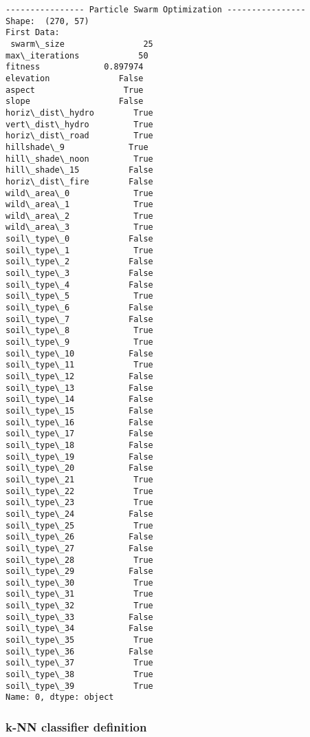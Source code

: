 \documentclass[11pt]{article}
\begin{document}
    \begin{Verbatim}[commandchars=\\\{\}]
---------------- Particle Swarm Optimization ----------------
Shape:  (270, 57)
First Data:
 swarm\_size                25
max\_iterations            50
fitness             0.897974
elevation              False
aspect                  True
slope                  False
horiz\_dist\_hydro        True
vert\_dist\_hydro         True
horiz\_dist\_road         True
hillshade\_9             True
hill\_shade\_noon         True
hill\_shade\_15          False
horiz\_dist\_fire        False
wild\_area\_0             True
wild\_area\_1             True
wild\_area\_2             True
wild\_area\_3             True
soil\_type\_0            False
soil\_type\_1             True
soil\_type\_2            False
soil\_type\_3            False
soil\_type\_4            False
soil\_type\_5             True
soil\_type\_6            False
soil\_type\_7            False
soil\_type\_8             True
soil\_type\_9             True
soil\_type\_10           False
soil\_type\_11            True
soil\_type\_12           False
soil\_type\_13           False
soil\_type\_14           False
soil\_type\_15           False
soil\_type\_16           False
soil\_type\_17           False
soil\_type\_18           False
soil\_type\_19           False
soil\_type\_20           False
soil\_type\_21            True
soil\_type\_22            True
soil\_type\_23            True
soil\_type\_24           False
soil\_type\_25            True
soil\_type\_26           False
soil\_type\_27           False
soil\_type\_28            True
soil\_type\_29           False
soil\_type\_30            True
soil\_type\_31            True
soil\_type\_32            True
soil\_type\_33           False
soil\_type\_34           False
soil\_type\_35            True
soil\_type\_36           False
soil\_type\_37            True
soil\_type\_38            True
soil\_type\_39            True
Name: 0, dtype: object

    \end{Verbatim}

    \subsubsection{k-NN classifier
definition}\label{k-nn-classifier-definition}
\end{document}
